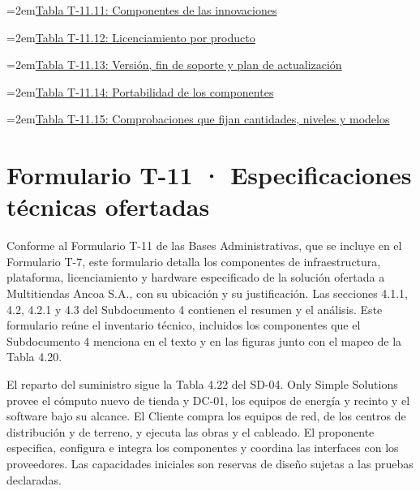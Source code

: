 \documentclass[11pt]{article}
\begin{document}
\noindent\hangindent=2em\hyperref[tab:t11-10]{Tabla T-11.11: Componentes de las innovaciones}\dotfill\pageref{tab:t11-10}\par\vspace{0.4\baselineskip}
\noindent\hangindent=2em\hyperref[tab:t11-11]{Tabla T-11.12: Licenciamiento por producto}\dotfill\pageref{tab:t11-11}\par\vspace{0.4\baselineskip}
\noindent\hangindent=2em\hyperref[tab:t11-12]{Tabla T-11.13: Versión, fin de soporte y plan de actualización}\dotfill\pageref{tab:t11-12}\par\vspace{0.4\baselineskip}
\noindent\hangindent=2em\hyperref[tab:t11-13]{Tabla T-11.14: Portabilidad de los componentes}\dotfill\pageref{tab:t11-13}\par\vspace{0.4\baselineskip}
\noindent\hangindent=2em\hyperref[tab:t11-14]{Tabla T-11.15: Comprobaciones que fijan cantidades, niveles y modelos}\dotfill\pageref{tab:t11-14}\par\vspace{0.4\baselineskip}
\clearpage


\renewcommand{\tablename}{Tabla}
\renewcommand{\thetable}{T-11.\arabic{table}}

\section{Formulario T-11 · Especificaciones técnicas ofertadas}\label{formulario-t-11}

Conforme al Formulario T-11 de las Bases Administrativas, que se incluye en el Formulario T-7, este formulario detalla los componentes de infraestructura, plataforma, licenciamiento y hardware especificado de la solución ofertada a Multitiendas Ancoa S.A., con su ubicación y su justificación. Las secciones 4.1.1, 4.2, 4.2.1 y 4.3 del Subdocumento 4 contienen el resumen y el análisis. Este formulario reúne el inventario técnico, incluidos los componentes que el Subdocumento 4 menciona en el texto y en las figuras junto con el mapeo de la Tabla 4.20.

El reparto del suministro sigue la Tabla 4.22 del SD-04. Only Simple Solutions provee el cómputo nuevo de tienda y DC-01, los equipos de energía y recinto y el software bajo su alcance. El Cliente compra los equipos de red, de los centros de distribución y de terreno, y ejecuta las obras y el cableado. El proponente especifica, configura e integra los componentes y coordina las interfaces con los proveedores. Las capacidades iniciales son reservas de diseño sujetas a las pruebas declaradas.
\end{document}
